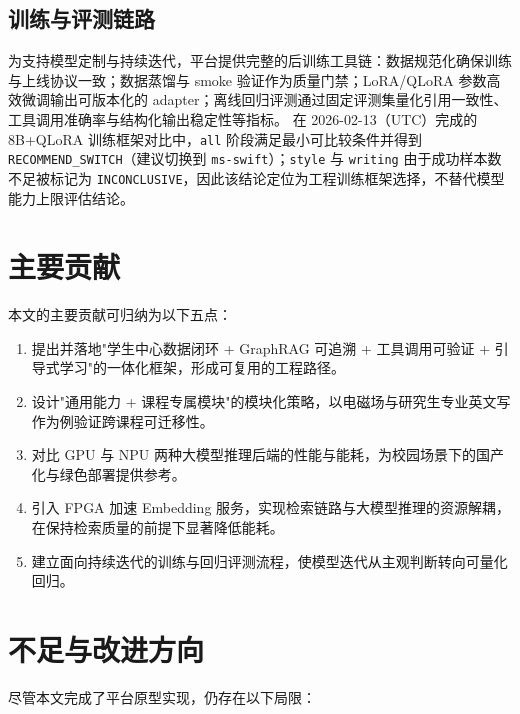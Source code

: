 \subsection{训练与评测链路}
为支持模型定制与持续迭代，平台提供完整的后训练工具链：数据规范化确保训练与上线协议一致；数据蒸馏与 smoke 验证作为质量门禁；LoRA/QLoRA 参数高效微调输出可版本化的 adapter；离线回归评测通过固定评测集量化引用一致性、工具调用准确率与结构化输出稳定性等指标。
在 2026-02-13（UTC）完成的 8B+QLoRA 训练框架对比中，\texttt{all} 阶段满足最小可比较条件并得到 \texttt{RECOMMEND\_SWITCH}（建议切换到 \texttt{ms-swift}）；\texttt{style} 与 \texttt{writing} 由于成功样本数不足被标记为 \texttt{INCONCLUSIVE}，因此该结论定位为工程训练框架选择，不替代模型能力上限评估结论。

\section{主要贡献}
本文的主要贡献可归纳为以下五点：
\begin{enumerate}[label=(\arabic*)]
  \item 提出并落地"学生中心数据闭环 + GraphRAG 可追溯 + 工具调用可验证 + 引导式学习"的一体化框架，形成可复用的工程路径。
  \item 设计"通用能力 + 课程专属模块"的模块化策略，以电磁场与研究生专业英文写作为例验证跨课程可迁移性。
  \item 对比 GPU 与 NPU 两种大模型推理后端的性能与能耗，为校园场景下的国产化与绿色部署提供参考。
  \item 引入 FPGA 加速 Embedding 服务，实现检索链路与大模型推理的资源解耦，在保持检索质量的前提下显著降低能耗。
  \item 建立面向持续迭代的训练与回归评测流程，使模型迭代从主观判断转向可量化回归。
\end{enumerate}

\section{不足与改进方向}
尽管本文完成了平台原型实现，仍存在以下局限：

